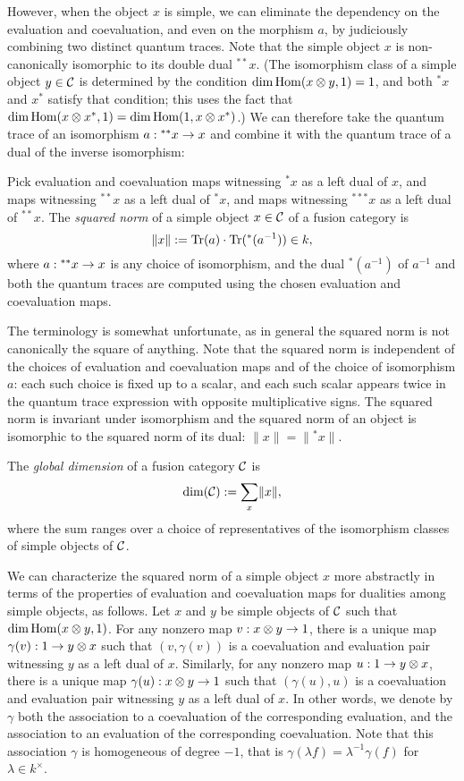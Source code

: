 \documentclass{amsart}
\begin{document}
However, when the object $x$ is simple, we can eliminate the dependency on the evaluation and coevaluation, and even on the morphism $a$, by judiciously combining two distinct quantum traces.  Note that the simple object $x$ is non-canonically isomorphic to its double dual ${}^{**} x$.  (The isomorphism class of a simple object $y \in \mathcal C$ is determined by the condition $\dim \operatorname{Hom}(x \otimes y,1) = 1$, and both ${}^* x$ and $x^*$ satisfy that condition; this uses the fact that $\dim \operatorname{Hom}(x \otimes x^*,1) = \dim \operatorname{Hom}(1, x \otimes x^*)$.)  We can therefore take the quantum trace of an isomorphism $a: {}^{**} x \rightarrow x$ and combine it with the quantum trace of a dual of the inverse isomorphism:
\begin{definition}
Pick evaluation and coevaluation maps witnessing ${}^* x$ as a left dual of $x$, and maps witnessing ${}^{**} x$ as a left dual of ${}^* x$, and maps witnessing ${}^{***} x$ as a left dual of ${}^{**} x$.  The \emph{squared norm} of a simple object $x \in \mathcal C$ of a fusion category is
\[
\lVert x \rVert := \mathrm{Tr}(a) \cdot \mathrm{Tr}({}^*(a^{-1})) \in k,
\]
where $a: {}^{**} x \rightarrow x$ is any choice of isomorphism, and the dual ${}^*(a^{-1})$ of $a^{-1}$ and both the quantum traces are computed using the chosen evaluation and coevaluation maps.
\end{definition}
\nid The terminology is somewhat unfortunate, as in general the squared norm is not canonically the square of anything.  Note that the squared norm is independent of the choices of evaluation and coevaluation maps and of the choice of isomorphism $a$: each such choice is fixed up to a scalar, and each such scalar appears twice in the quantum trace expression with opposite multiplicative signs.  The squared norm is invariant under isomorphism and the squared norm of an object is isomorphic to the squared norm of its dual: $\lVert x \rVert = \lVert {}^* x \rVert$.
\begin{definition}
The \emph{global dimension} of a fusion category $\mathcal C$ is
\[
\dim(\mathcal C) := \sum_{x} \lVert x \rVert,
\]
where the sum ranges over a choice of representatives of the isomorphism classes of simple objects of $\mathcal C$.
\end{definition}

We can characterize the squared norm of a simple object $x$ more abstractly in terms of the properties of evaluation and coevaluation maps for dualities among simple objects, as follows.  Let $x$ and $y$ be simple objects of $\mathcal C$ such that $\dim \operatorname{Hom}(x \otimes y,1)$.  For any nonzero map $v: x \otimes y \rightarrow 1$, there is a unique map $\gamma(v): 1 \rightarrow y \otimes x$ such that $(v,\gamma(v))$ is a coevaluation and evaluation pair witnessing $y$ as a left dual of $x$.  Similarly, for any nonzero map $u: 1 \rightarrow y \otimes x$, there is a unique map $\gamma(u): x \otimes y \rightarrow 1$ such that $(\gamma(u),u)$ is a coevaluation and evaluation pair witnessing $y$ as a left dual of $x$.  In other words, we denote by $\gamma$ both the association to a coevaluation of the corresponding evaluation, and the association to an evaluation of the corresponding coevaluation.  Note that this association $\gamma$ is homogeneous of degree $-1$, that is $\gamma(\lambda f) = \lambda^{-1} \gamma(f)$ for $\lambda \in k^\times$.  
\end{document}
